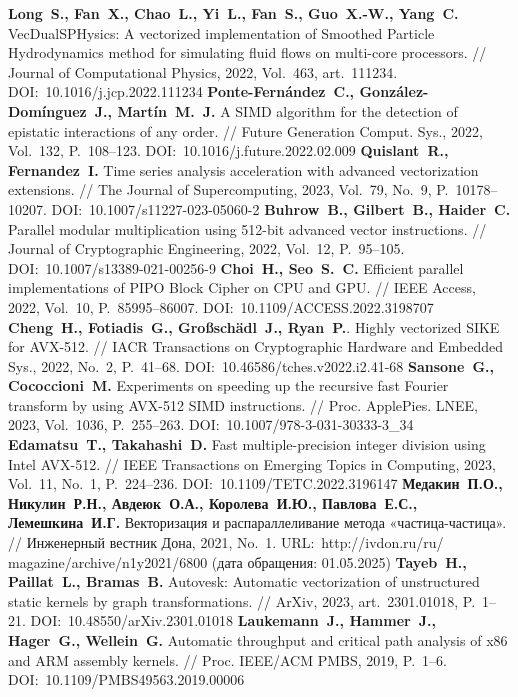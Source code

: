 \begin{thebibliography}{99}
%
\textbf{Long~S., Fan~X., Chao~L., Yi~L., Fan~S., Guo~X.-W., Yang~C.} VecDualSPHysics: A vectorized implementation of Smoothed Particle Hydrodynamics method for simulating fluid flows on multi-core processors. // Journal of Computational Physics, 2022, Vol.~463, art.~111234. DOI:~10.1016/j.jcp.2022.111234
%
\textbf{Ponte-Fern{\'a}ndez~C., Gonz{\'a}lez-Dom{\'i}nguez~J., Mart{\'i}n~M.~J.} A SIMD algorithm for the detection of epistatic interactions of any order. // Future Generation Comput. Sys., 2022, Vol.~132, P.~108–123. DOI:~10.1016/j.future.2022.02.009
%
\textbf{Quislant~R., Fernandez~I.} Time series analysis acceleration with advanced vectorization extensions. // The Journal of Supercomputing, 2023, Vol.~79, No.~9, P.~10178–10207. DOI:~10.1007/s11227-023-05060-2
%
\textbf{Buhrow~B., Gilbert~B., Haider~C.} Parallel modular multiplication using 512-bit advanced vector instructions. // Journal of Cryptographic Engineering, 2022, Vol.~12, P.~95–105. DOI:~10.1007/s13389-021-00256-9
%
\textbf{Choi~H., Seo~S.~C.} Efficient parallel implementations of PIPO Block Cipher on CPU and GPU. // IEEE Access, 2022, Vol.~10, P.~85995–86007. DOI:~10.1109/ACCESS.2022.3198707
%
\textbf{Cheng~H., Fotiadis~G., Gro{\ss}sch{\"a}dl~J., Ryan~P.}. Highly vectorized SIKE for AVX-512. // IACR Transactions on Cryptographic Hardware and Embedded Sys., 2022, No.~2, P.~41–68. DOI:~10.46586/tches.v2022.i2.41-68
%
\textbf{Sansone~G., Cococcioni~M.} Experiments on speeding up the recursive fast Fourier transform by using AVX-512 SIMD instructions. // Proc. ApplePies. LNEE, 2023, Vol.~1036, P.~255–263. DOI:~10.1007/978-3-031-30333-3\_34
%
\textbf{Edamatsu~T., Takahashi~D.} Fast multiple-precision integer division using Intel AVX-512. // IEEE Transactions on Emerging Topics in Computing, 2023, Vol.~11, No.~1, P.~224–236. DOI:~10.1109/TETC.2022.3196147
%
\textbf{Медакин~П.О., Никулин~Р.Н., Авдеюк~О.А., Королева~И.Ю., Павлова~Е.С., Лемешкина~И.Г.} Векторизация и распараллеливание метода «частица-частица». // Инженерный вестник Дона, 2021, No.~1. URL:~http://ivdon.ru/ru/
magazine/archive/n1y2021/6800 (дата обращения: 01.05.2025)
%
\textbf{Tayeb~H., Paillat~L., Bramas~B.} Autovesk: Automatic vectorization of unstructured static kernels by graph transformations. // ArXiv, 2023, art.~2301.01018, P.~1–21. DOI:~10.48550/arXiv.2301.01018
%
\textbf{Laukemann~J., Hammer~J., Hager~G., Wellein~G.} Automatic throughput and critical path analysis of x86 and ARM assembly kernels. // Proc. IEEE/ACM PMBS, 2019, P.~1–6. DOI:~10.1109/PMBS49563.2019.00006
%




\end{thebibliography}
